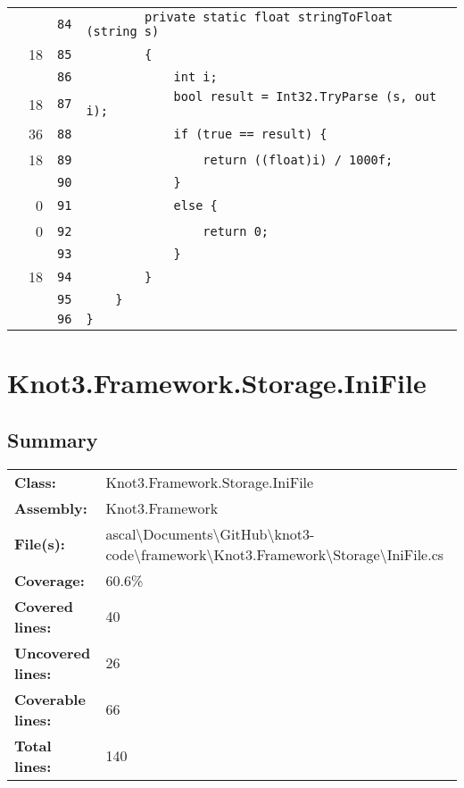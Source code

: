 \documentclass[a4paper,10pt]{article}
\begin{document}
\begin{longtable}[l]{lrrl}
\cellcolor{gray} &  & \verb~84~ & \verb~        private static float stringToFloat (string s)~\\
\cellcolor{green} & 18 & \verb~85~ & \verb~        {~\\
\cellcolor{gray} &  & \verb~86~ & \verb~            int i;~\\
\cellcolor{green} & 18 & \verb~87~ & \verb~            bool result = Int32.TryParse (s, out i);~\\
\cellcolor{green} & 36 & \verb~88~ & \verb~            if (true == result) {~\\
\cellcolor{green} & 18 & \verb~89~ & \verb~                return ((float)i) / 1000f;~\\
\cellcolor{gray} &  & \verb~90~ & \verb~            }~\\
\cellcolor{red} & 0 & \verb~91~ & \verb~            else {~\\
\cellcolor{red} & 0 & \verb~92~ & \verb~                return 0;~\\
\cellcolor{gray} &  & \verb~93~ & \verb~            }~\\
\cellcolor{green} & 18 & \verb~94~ & \verb~        }~\\
\cellcolor{gray} &  & \verb~95~ & \verb~    }~\\
\cellcolor{gray} &  & \verb~96~ & \verb~}~\\
\end{longtable}
\newpage
\section{Knot3.Framework.Storage.IniFile}
\subsection{Summary}
\begin{longtable}[l]{ll}
\textbf{Class:} & Knot3.Framework.Storage.IniFile\\
\textbf{Assembly:} & Knot3.Framework\\
\textbf{File(s):} & \begin{minipage}[t]{12cm}{ascal\textbackslash Documents\textbackslash GitHub\textbackslash knot3-code\textbackslash framework\textbackslash Knot3.Framework\textbackslash Storage\textbackslash IniFile.cs}\end{minipage} \\
\textbf{Coverage:} & 60.6\%\\
\textbf{Covered lines:} & 40\\
\textbf{Uncovered lines:} & 26\\
\textbf{Coverable lines:} & 66\\
\textbf{Total lines:} & 140\\
\end{longtable}
\end{document}
